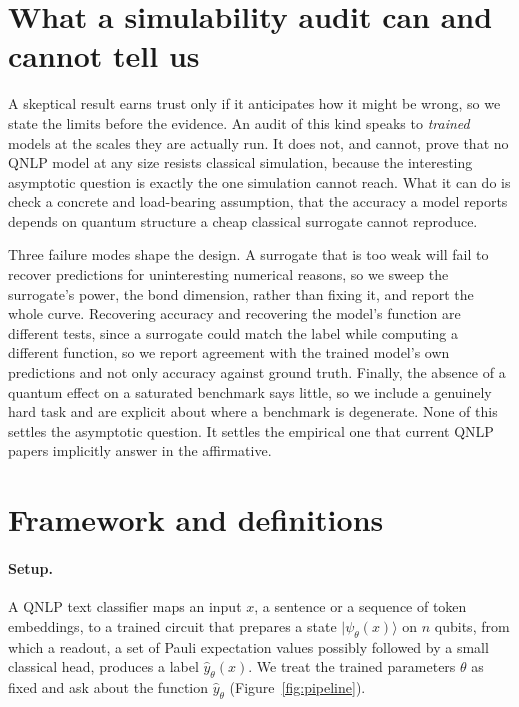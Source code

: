 \documentclass[10pt]{article}
\begin{document}
\section{What a simulability audit can and cannot tell us}
\label{sec:epistemics}
A skeptical result earns trust only if it anticipates how it might be wrong, so we state the limits
before the evidence. An audit of this kind speaks to \emph{trained} models at the scales they are
actually run. It does not, and cannot, prove that no QNLP model at any size resists classical
simulation, because the interesting asymptotic question is exactly the one simulation cannot reach.
What it can do is check a concrete and load-bearing assumption, that the accuracy a model reports
depends on quantum structure a cheap classical surrogate cannot reproduce.

Three failure modes shape the design. A surrogate that is too weak will fail to recover predictions
for uninteresting numerical reasons, so we sweep the surrogate's power, the bond dimension, rather
than fixing it, and report the whole curve. Recovering accuracy and recovering the model's function
are different tests, since a surrogate could match the label while computing a different function,
so we report agreement with the trained model's own predictions and not only accuracy against
ground truth. Finally, the absence of a quantum effect on a saturated benchmark says little, so we
include a genuinely hard task and are explicit about where a benchmark is degenerate. None of this
settles the asymptotic question. It settles the empirical one that current QNLP papers implicitly
answer in the affirmative.

\section{Framework and definitions}
\label{sec:framework}

\paragraph{Setup.} A QNLP text classifier maps an input $x$, a sentence or a sequence of token
embeddings, to a trained circuit that prepares a state $|\psi_\theta(x)\rangle$ on $n$ qubits, from
which a readout, a set of Pauli expectation values possibly followed by a small classical head,
produces a label $\hat y_\theta(x)$. We treat the trained parameters $\theta$ as fixed and ask
about the function $\hat y_\theta$ (Figure~\ref{fig:pipeline}).
\end{document}
